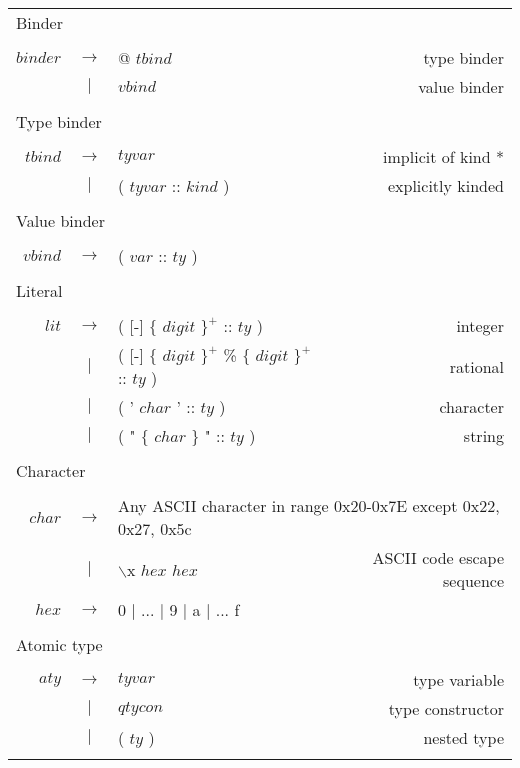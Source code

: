 \begin{scriptsize}
\begin{longtable}{ r c l r }
\multicolumn{4}{l}{Binder}			 \\
\\[0.01in]
$binder$	& $ \rightarrow $	& @ $tbind$										& type binder		\\
		& $ | $			& $vbind$										& value binder		\\
\\[0.01in]

\multicolumn{4}{l}{Type binder}			 \\
\\[0.01in]
$tbind$		& $ \rightarrow $	& $tyvar$										& implicit of kind * 	\\
		& $ | $			& ( $tyvar$ :: $kind$ )									& explicitly kinded	\\
\\[0.01in]

\multicolumn{4}{l}{Value binder}			 \\
\\[0.01in]
$vbind$		& $ \rightarrow $	& ( $var$ :: $ty$ )									& \\
\\[0.01in]

\multicolumn{4}{l}{Literal}			 \\
\\[0.01in]
$lit$		& $ \rightarrow $	& ( $[$-$]$ $\{$ $digit$ $\}^{+}$ :: $ty$ )						& integer 		\\ 
		& $ | $			& ( $[$-$]$ $\{$ $digit$ $\}^{+}$ \% $\{$ $digit$ $\}^{+}$ :: $ty$ )			& rational		\\
		& $ | $			& ( ' $char$ ' :: $ty$ )								& character		\\
		& $ | $			& ( " $\{$ $char$ $\}$ " :: $ty$ )							& string		\\
\\[0.01in]

\multicolumn{4}{l}{Character}			 \\
\\[0.01in]
$char$		& $ \rightarrow $	& \multicolumn{2}{l}{Any ASCII character in range 0x20-0x7E except 0x22, 0x27, 0x5c}			 \\
		& $ | $			& $\backslash$x $hex$ $hex$								& ASCII code escape sequence \\
$hex$		& $ \rightarrow $	& 0 $|$ ... $|$ 9 $|$ a $|$ ... f							& \\
\\[0.01in]

\multicolumn{4}{l}{Atomic type}			 \\
\\[0.01in]
$aty$		& $ \rightarrow $	& $tyvar$										& type variable 	\\
		& $ | $			& $qtycon$										& type constructor	\\
		& $ | $ 		& ( $ty$ )										& nested type 		\\
\\[0.01in]


\end{longtable}
\end{scriptsize}
